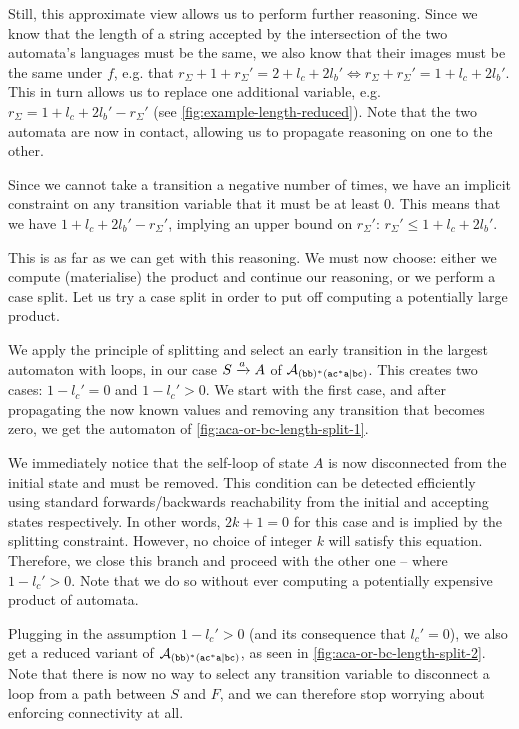 \documentclass[acmsmall,review,anonymous,screen]{acmart}\settopmatter{printfolios=true,printccs=true,printacmref=true}
\theoremstyle{definition}
\begin{document}
Still, this approximate view allows us to perform further reasoning. Since we
know that the length of a string accepted by the intersection of the two
automata's languages must be the same, we also know that their images must be
the same under $f$, e.g. that $r_\Sigma + 1 + r_\Sigma' = 2 + l_c + 2l_b' \iff
r_\Sigma + r_\Sigma' = 1 + l_c + 2l_b'$. This in turn allows us to replace one
additional variable, e.g. $r_\Sigma = 1 + l_c + 2l_b' - r_\Sigma'$ (see
\cref{fig:example-length-reduced}). Note that the two automata are now in
contact, allowing us to propagate reasoning on one to the other.

Since we cannot take a transition a negative number of times, we have an
implicit constraint on any transition variable that it must be at least $0$.
This means that we have $1 + l_c + 2l_b' - r_\Sigma'$, implying an upper bound
on $r_\Sigma'$: $r_\Sigma' \leq 1 + l_c + 2l_b'$.

This is as far as we can get with this reasoning. We must now choose: either we
compute (materialise) the product and continue our reasoning, or we perform a
case split. Let us try a case split in order to put off computing a potentially
large product.

We apply the principle of splitting and select an early transition in the
largest automaton with loops, in our case $S \xrightarrow{a} A$ of $\mathcal{A}_{\mathtt{(bb)^\ast(ac^\ast{}a|bc)}}$.
This creates two cases: $1-l_c' = 0$ and $1-l_c' > 0$. We start with the first
case, and after propagating the now known values and removing any transition
that becomes zero, we get the automaton of \cref{fig:aca-or-bc-length-split-1}.

We immediately notice that the self-loop of state $A$ is now disconnected from
the initial state and must be removed. This condition can be detected
efficiently using standard forwards/backwards reachability from the initial
and accepting states respectively. In other words, $2k+1 = 0$ for this case
and is implied by the splitting constraint. However, no choice of integer $k$
will satisfy this equation. Therefore, we close this branch and proceed with
the other one -- where $1-l_c' > 0$. Note that we do so without ever computing
a potentially expensive product of automata.
  
Plugging in the assumption $1-l_c' > 0$ (and its consequence that $l_c' = 0$),
we also get a reduced variant of $\mathcal{A}_{\mathtt{(bb)^\ast(ac^\ast{}a|bc)}}$, as seen in
\cref{fig:aca-or-bc-length-split-2}. Note that there is now no way to select any
transition variable to disconnect a loop from a path between $S$ and $F$,
and we can therefore stop worrying about enforcing connectivity at all.
\end{document}
